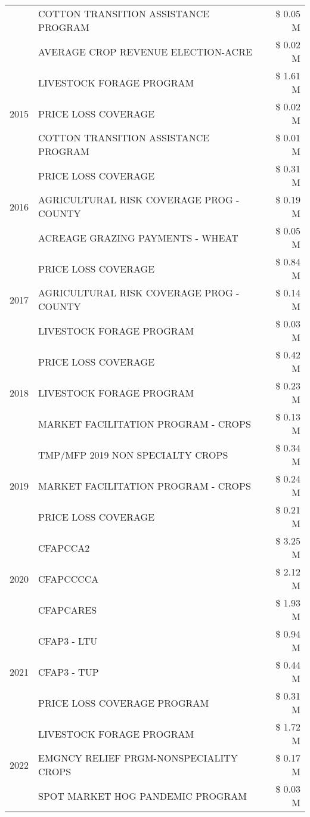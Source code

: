 \begin{tabular}{llr}
 & COTTON TRANSITION ASSISTANCE PROGRAM & \$ 0.05 M \\
 & AVERAGE CROP REVENUE ELECTION-ACRE & \$ 0.02 M \\
\cline{1-3}
\multirow[t]{3}{*}{2015} & LIVESTOCK FORAGE PROGRAM & \$ 1.61 M \\
 & PRICE LOSS COVERAGE & \$ 0.02 M \\
 & COTTON TRANSITION ASSISTANCE PROGRAM & \$ 0.01 M \\
\cline{1-3}
\multirow[t]{3}{*}{2016} & PRICE LOSS COVERAGE & \$ 0.31 M \\
 & AGRICULTURAL RISK COVERAGE PROG - COUNTY & \$ 0.19 M \\
 & ACREAGE GRAZING PAYMENTS - WHEAT & \$ 0.05 M \\
\cline{1-3}
\multirow[t]{3}{*}{2017} & PRICE LOSS COVERAGE & \$ 0.84 M \\
 & AGRICULTURAL RISK COVERAGE PROG - COUNTY & \$ 0.14 M \\
 & LIVESTOCK FORAGE PROGRAM & \$ 0.03 M \\
\cline{1-3}
\multirow[t]{3}{*}{2018} & PRICE LOSS COVERAGE & \$ 0.42 M \\
 & LIVESTOCK FORAGE PROGRAM & \$ 0.23 M \\
 & MARKET FACILITATION PROGRAM - CROPS & \$ 0.13 M \\
\cline{1-3}
\multirow[t]{3}{*}{2019} & TMP/MFP 2019 NON SPECIALTY CROPS & \$ 0.34 M \\
 & MARKET FACILITATION PROGRAM - CROPS & \$ 0.24 M \\
 & PRICE LOSS COVERAGE & \$ 0.21 M \\
\cline{1-3}
\multirow[t]{3}{*}{2020} & CFAPCCA2 & \$ 3.25 M \\
 & CFAPCCCCA & \$ 2.12 M \\
 & CFAPCARES & \$ 1.93 M \\
\cline{1-3}
\multirow[t]{3}{*}{2021} & CFAP3 - LTU & \$ 0.94 M \\
 & CFAP3 - TUP & \$ 0.44 M \\
 & PRICE LOSS COVERAGE PROGRAM & \$ 0.31 M \\
\cline{1-3}
\multirow[t]{3}{*}{2022} & LIVESTOCK FORAGE PROGRAM & \$ 1.72 M \\
 & EMGNCY RELIEF PRGM-NONSPECIALITY CROPS & \$ 0.17 M \\
 & SPOT MARKET HOG PANDEMIC PROGRAM & \$ 0.03 M \\
\cline{1-3}
\bottomrule
\end{tabular}
